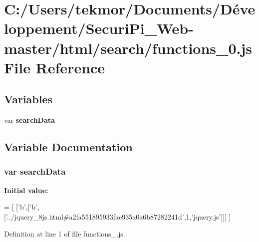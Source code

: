 \section{C\+:/\+Users/tekmor/\+Documents/\+Développement/\+Securi\+Pi\+\_\+\+Web-\/master/html/search/functions\+\_\+0.js File Reference}
\label{functions__0_8js}
\subsection*{Variables}
\begin{DoxyCompactItemize}
\item 
var {\bf search\+Data}
\end{DoxyCompactItemize}


\subsection{Variable Documentation}
\subsubsection[{search\+Data}]{\setlength{\rightskip}{0pt plus 5cm}var search\+Data}\label{functions__0_8js_ad01a7523f103d6242ef9b0451861231e}
{\bfseries Initial value\+:}
\begin{DoxyCode}
=
[
  [\textcolor{charliteral}{'b'},[\textcolor{charliteral}{'b'},[\textcolor{stringliteral}{'../jquery\_8js.html#a2fa551895933fae935a0a6b87282241d'},1,\textcolor{stringliteral}{'jquery.js'}]]]
]
\end{DoxyCode}


Definition at line 1 of file functions\+\_.\+js.


